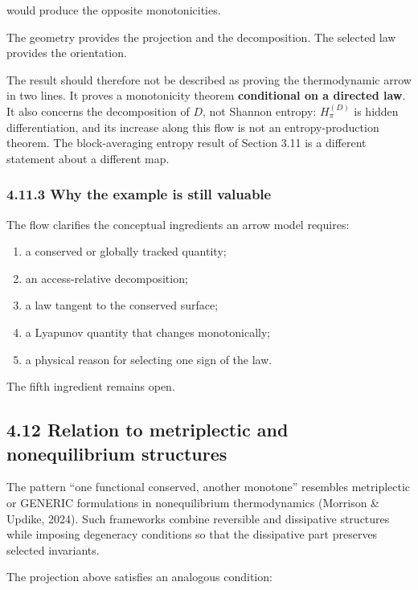 \documentclass[
  11pt,
]{article}
\providecommand{\tightlist}{%
  \setlength{\itemsep}{0pt}\setlength{\parskip}{0pt}}
\begin{document}
would produce the opposite monotonicities.

The geometry provides the projection and the decomposition. The selected
law provides the orientation.

The result should therefore not be described as proving the
thermodynamic arrow in two lines. It proves a monotonicity theorem
\textbf{conditional on a directed law}. It also concerns the
decomposition of \(D\), not Shannon entropy: \(H_\pi^{(D)}\) is hidden
differentiation, and its increase along this flow is not an
entropy-production theorem. The block-averaging entropy result of
Section 3.11 is a different statement about a different map.

\subsubsection{4.11.3 Why the example is still
valuable}\label{why-the-example-is-still-valuable}

The flow clarifies the conceptual ingredients an arrow model requires:

\begin{enumerate}
\def\labelenumi{\arabic{enumi}.}
\tightlist
\item
  a conserved or globally tracked quantity;
\item
  an access-relative decomposition;
\item
  a law tangent to the conserved surface;
\item
  a Lyapunov quantity that changes monotonically;
\item
  a physical reason for selecting one sign of the law.
\end{enumerate}

The fifth ingredient remains open.

\subsection{4.12 Relation to metriplectic and nonequilibrium
structures}\label{relation-to-metriplectic-and-nonequilibrium-structures}

The pattern ``one functional conserved, another monotone'' resembles
metriplectic or GENERIC formulations in nonequilibrium thermodynamics
(Morrison \& Updike, 2024). Such frameworks combine reversible and
dissipative structures while imposing degeneracy conditions so that the
dissipative part preserves selected invariants.

The projection above satisfies an analogous condition:
\end{document}
